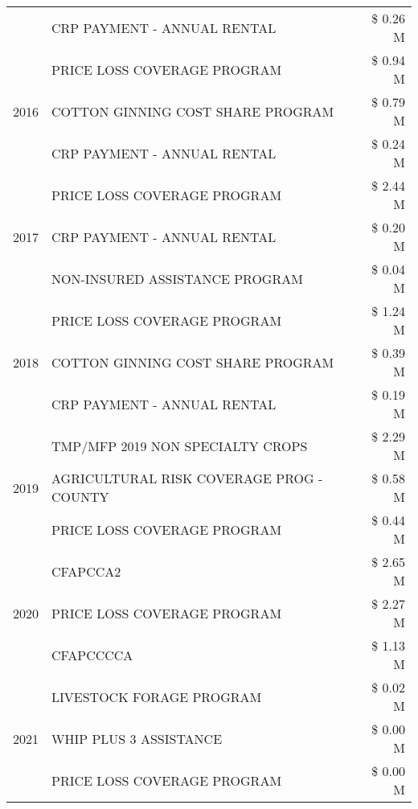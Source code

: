 \begin{tabular}{llr}
 & CRP PAYMENT - ANNUAL RENTAL & \$ 0.26 M \\
\cline{1-3}
\multirow[t]{3}{*}{2016} & PRICE LOSS COVERAGE PROGRAM & \$ 0.94 M \\
 & COTTON GINNING COST SHARE PROGRAM & \$ 0.79 M \\
 & CRP PAYMENT - ANNUAL RENTAL & \$ 0.24 M \\
\cline{1-3}
\multirow[t]{3}{*}{2017} & PRICE LOSS COVERAGE PROGRAM & \$ 2.44 M \\
 & CRP PAYMENT - ANNUAL RENTAL & \$ 0.20 M \\
 & NON-INSURED ASSISTANCE PROGRAM & \$ 0.04 M \\
\cline{1-3}
\multirow[t]{3}{*}{2018} & PRICE LOSS COVERAGE PROGRAM & \$ 1.24 M \\
 & COTTON GINNING COST SHARE PROGRAM & \$ 0.39 M \\
 & CRP PAYMENT - ANNUAL RENTAL & \$ 0.19 M \\
\cline{1-3}
\multirow[t]{3}{*}{2019} & TMP/MFP 2019 NON SPECIALTY CROPS & \$ 2.29 M \\
 & AGRICULTURAL RISK COVERAGE PROG - COUNTY & \$ 0.58 M \\
 & PRICE LOSS COVERAGE PROGRAM & \$ 0.44 M \\
\cline{1-3}
\multirow[t]{3}{*}{2020} & CFAPCCA2 & \$ 2.65 M \\
 & PRICE LOSS COVERAGE PROGRAM & \$ 2.27 M \\
 & CFAPCCCCA & \$ 1.13 M \\
\cline{1-3}
\multirow[t]{3}{*}{2021} & LIVESTOCK FORAGE PROGRAM & \$ 0.02 M \\
 & WHIP PLUS 3 ASSISTANCE & \$ 0.00 M \\
 & PRICE LOSS COVERAGE PROGRAM & \$ 0.00 M \\
\cline{1-3}
\bottomrule
\end{tabular}
